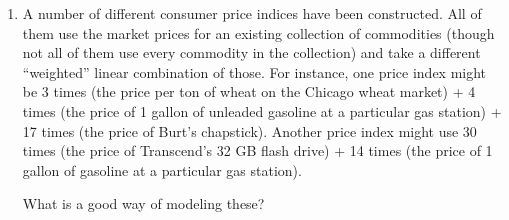 \documentclass[10pt]{amsart}
\begin{document}
\begin{enumerate}
  As for the other options:

  \begin{itemize}
  \item Option (A): This is a diagonal matrix with all entries
    nonzero. Thus, its rref is the identity matrix. It is easy to see
    this: just divide each row by its diagonal entry.
  \item Option (B): This is upper-triangular. We can first convert the
    diagonal entries to $1$ by dividing. Then, we can do row
    subtractions and clear out everything above the diagonal.
  \item Option (C): This is lower-triangular, and works for a reason
    similar to Option (B).
  \item Option (E): This actually needs to be worked out using row
    reduction.
  \end{itemize}

  {\em Performance review}: 18 out of 28 got this. 4 chose (E), 2 each
  chose (B) and (C), 2 wrote incorrect free-form responses.

  {\em Historical note (last time)}: $24$ out of $27$ got this. $1$ each chose
  (B), (C), and (E).

\item A number of different consumer price indices have been
  constructed. All of them use the market prices for an existing
  collection of commodities (though not all of them use every
  commodity in the collection) and take a different ``weighted''
  linear combination of those. For instance, one price index might be
  3 times (the price per ton of wheat on the Chicago wheat market) + 4
  times (the price of 1 gallon of unleaded gasoline at a particular
  gas station) + 17 times (the price of Burt's chapstick). Another
  price index might use 30 times (the price of Transcend's 32 GB flash
  drive) + 14 times (the price of 1 gallon of gasoline at a particular
  gas station).

  What is a good way of modeling these?


\end{enumerate}
\end{document}
